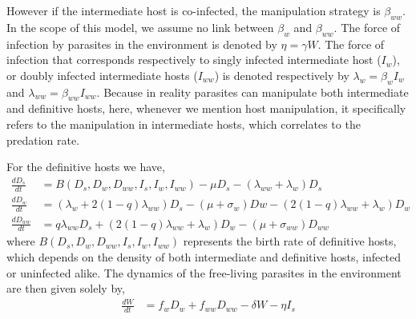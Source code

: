 \documentclass[11pt]{article}
\begin{document}
However if the intermediate host is co-infected, the manipulation strategy is $\beta_{ww}$. 
In the scope of this model, we assume no link between $\beta_w$ and $\beta_{ww}$. 
The force of infection by parasites in the environment is denoted by $\eta = \gamma W$. 
The force of infection that corresponds respectively to singly infected intermediate host ($I_w$), or doubly infected intermediate hosts ($I_{ww}$) is denoted respectively by $\lambda_w = \beta_w I_w$ and $\lambda_{ww} = \beta_{ww} I_{ww}$. Because in reality parasites can manipulate both intermediate and definitive hosts, here, whenever we mention host manipulation, it specifically refers to the manipulation in intermediate hosts, which correlates to the predation rate.

For the definitive hosts we have,
\begin{align}
\frac{dD_s}{dt} &= B(D_s,  D_w,  D_{ww},  I_s, I_w, I_{ww})  - \mu D_s - (\lambda_{ww} + \lambda_w) D_s \nonumber \\    
\frac{dD_w}{dt} &= (\lambda_w + 2 (1 - q) \lambda_{ww}) D_s - (\mu + \sigma_w) Dw - (2 (1 - q) \lambda_{ww} + \lambda_w) D_w  \label{odes:dhosts} \\         
\frac{dD_{ww}}{dt} &= q \lambda_{ww} D_s + (2 (1 - q) \lambda_{ww} + \lambda_w) D_w - (\mu + \sigma_{ww}) D_{ww} \nonumber
\end{align}
%
where $B(D_s, D_w, D_{ww}, I_s, I_w, I_{ww})$ represents the birth rate of definitive hosts, which depends on the density of both intermediate and definitive hosts, infected or uninfected alike. 
The dynamics of the free-living parasites in the environment are then given solely by,
\begin{align}
	\frac{dW}{dt} &= f_w D_w + f_{ww} D_{ww} - \delta W - \eta I_s \label{odes:eparasite}
\end{align}
\end{document}
